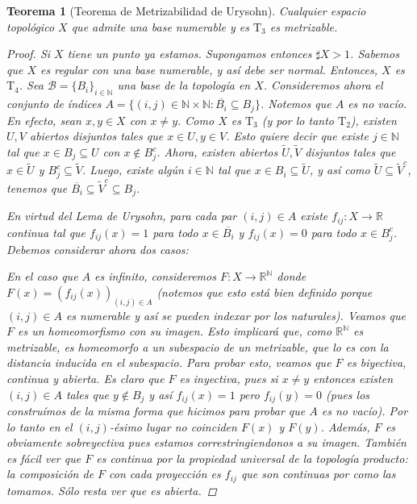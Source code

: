 \documentclass[12pt]{book}
\newtheorem{teo}{Teorema}[section]
\theoremstyle{definition}
\newcommand{\RR}{\mathbb{R}}      %
\newcommand{\NN}{\mathbb{N}}
\begin{document}
\begin{teo}[Teorema de Metrizabilidad de Urysohn]
Cualquier espacio topológico $X$ que admite una base numerable y es $\mathrm{T}_3$ es metrizable.
\begin{proof}
Si $X$ tiene un punto ya estamos. Supongamos entonces $\sharp X>1$. Sabemos que $X$ es regular con una base numerable, y así debe ser normal. Entonces, $X$ es $\mathrm{T}_4$. Sea $\mathscr{B} = \{B_i\}_{i\in\NN}$ una base de la topología en $X$. Consideremos ahora el conjunto de índices $A=\{(i,j)\in\NN\times\NN : \overline{B_i}\subseteq B_j\}$. Notemos que $A$ es no vacío. En efecto, sean $x,y\in X$ con $x\neq y$. Como $X$ es $\mathrm{T}_3$ (y por lo tanto $\mathrm{T}_2$), existen $U,V$ abiertos disjuntos tales que $x\in U, y\in V$. Esto quiere decir que existe $j\in\NN$ tal que $x\in B_j\subseteq U$ con $x\notin B_j^c$. Ahora, existen abiertos $\tilde{U},\tilde{V}$ disjuntos tales que $x\in\tilde{U}$ y $B_j^c\subseteq\tilde{V}$. Luego, existe algún $i\in\NN$ tal que $x\in B_i\subseteq \tilde{U}$, y así como $\tilde{U}\subseteq \tilde{V}^c$, tenemos que $\overline{B_i}\subseteq \tilde{V}^c \subseteq B_j$.

En virtud del Lema de Urysohn, para cada par $(i,j)\in A$ existe $f_{ij}:X\to \RR$ continua tal que $f_{ij}(x) = 1$ para todo $x\in\overline{B_i}$ y $f_{ij}(x)=0$ para todo $x\in B_j^c$. Debemos considerar ahora dos casos:

En el caso que $A$ es infinito, consideremos $F:X\to\RR^\NN$ donde $F(x)= (f_{ij}(x))_{(i,j)\in A}$ (notemos que esto está bien definido porque $(i,j)\in A$ es numerable y así se pueden indexar por los naturales). Veamos que $F$ es un homeomorfismo con su imagen. Esto implicará que, como $\RR^\NN$ es metrizable, es homeomorfo a un subespacio de un metrizable, que lo es con la distancia inducida en el subespacio. Para probar esto, veamos que $F$ es biyectiva, continua y abierta. Es claro que $F$ es inyectiva, pues si $x\neq y$ entonces existen $(i,j)\in A$ tales que $y\notin B_j$ y así $f_{ij}(x)=1$ pero $f_{ij}(y)=0$ (pues los construímos de la misma forma que hicimos para probar que $A$ es no vacío). Por lo tanto en el $(i,j)$-ésimo lugar no coinciden $F(x)$ y $F(y)$. Además, $F$ es obviamente sobreyectiva pues estamos correstringiendonos a su imagen. También es fácil ver que $F$ es continua por la propiedad universal de la topología producto: la composición de $F$ con cada proyección es $f_{ij}$ que son continuas por como las tomamos. Sólo resta ver que es abierta.


\end{proof}
\end{teo}
\end{document}
